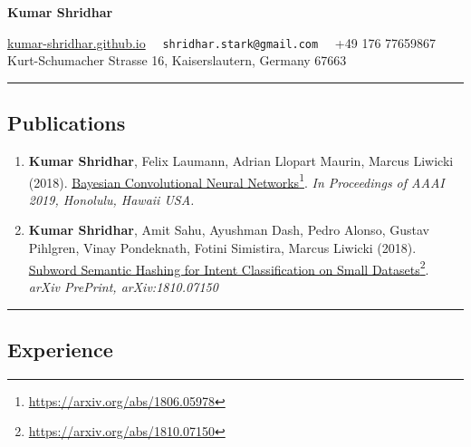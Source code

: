 \documentclass[10pt,letterpaper]{article}
\begin{document}
\begin{center}
{\LARGE \color{MidnightBlue} \textbf{Kumar Shridhar}}

{\color{BrickRed}\url{ kumar-shridhar.github.io}\color{BrickRed}} \textbullet
\ \ \texttt{shridhar.stark@gmail.com} \textbullet
\ \ +49 176 77659867
\\
Kurt-Schumacher Strasse 16, Kaiserslautern, Germany  67663
\end{center}


\hrule
\vspace{-0.4em}
\subsection*{\color{MidnightBlue}Publications}

\begin{enumerate}
	\parskip=0.1em
	
	
	\item\textbf{Kumar Shridhar},  Felix Laumann, Adrian Llopart Maurin, Marcus Liwicki (2018). \href{https://arxiv.org/abs/1806.05978}{Bayesian Convolutional Neural Networks}\footnote{\url{https://arxiv.org/abs/1806.05978}}. \emph{In Proceedings of AAAI 2019, Honolulu, Hawaii USA.}
	
	\item\textbf{Kumar Shridhar}, Amit Sahu, Ayushman Dash, Pedro Alonso, Gustav Pihlgren, Vinay Pondeknath, Fotini Simistira, Marcus Liwicki (2018). \href{https://arxiv.org/abs/1810.07150}{Subword Semantic Hashing for Intent Classification on Small Datasets}\footnote{\url{https://arxiv.org/abs/1810.07150}}. \emph{arXiv PrePrint, arXiv:1810.07150}
\end{enumerate}


\hrule
\vspace{-0.4em}
\subsection*{\color{MidnightBlue}Experience}
\end{document}
